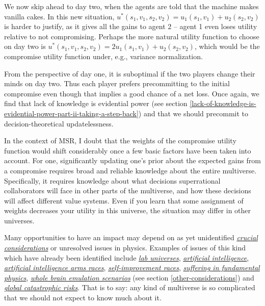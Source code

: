 We now skip ahead to day two, when the agents are told that the machine
makes vanilla cakes. In this new situation,
\(u^{*}(s_{1},v_{1},s_{2},v_{2}) = u_{1}(s_{1},v_{1}) + u_{2}(s_{2},v_{2})\)
is harder to justify, as it gives all the gains to agent 2 -- agent 1
even loses utility relative to not compromising. Perhaps the more
natural utility function to choose on day two is
\(u^{*}(s_{1},v_{1},s_{2},v_{2}) = {2u}_{1}(s_{1},v_{1}) + u_{2}(s_{2},v_{2})\),
which would be the compromise utility function under, e.g., variance
normalization.

From the perspective of day one, it is suboptimal if the two players
change their minds on day two. Thus each player prefers precommitting to
the initial compromise even though that implies a good chance of a net
loss. Once again, we find that lack of knowledge is evidential power
(see section
\ref{lack-of-knowledge-is-evidential-power-part-ii-taking-a-step-back}) and
that we should precommit to decision-theoretical updatelessness.

In the context of MSR, I doubt that the weights of the compromise
utility function would shift considerably once a few basic factors have
been taken into account. For one, significantly updating one's prior
about the expected gains from a compromise requires broad and reliable
knowledge about the entire multiverse. Specifically, it requires
knowledge about what decisions superrational collaborators will face in
other parts of the multiverse, and how these decisions will affect
different value systems. Even if you learn that some assignment of
weights decreases your utility in this universe, the situation may
differ in other universes.

Many opportunities to have an impact may depend on as yet unidentified
\href{https://casparoesterheld.files.wordpress.com/2016/11/crucialconsiderations1.pdf}{\emph{crucial
considerations}} or unresolved issues in physics. Examples of issues of
this kind which have already been identified include
\href{http://reducing-suffering.org/lab-universes-creating-infinite-suffering/}{\emph{lab
universes}},
\href{https://foundational-research.org/why-altruists-should-focus-on-artificial-intelligence/}{\emph{artificial
intelligence}},
\href{https://wiki.lesswrong.com/wiki/AI_arms_race}{\emph{artificial
intelligence arms races}},
\href{https://casparoesterheld.com/2016/07/04/self-improvement-races/}{\emph{self-improvement
races}},
\href{http://reducing-suffering.org/is-there-suffering-in-fundamental-physics/}{\emph{suffering
in fundamental physics}}, \protect\hyperlink{_v01fa6ipo6d7}{\emph{whole
brain emulation scenarios}} (see section
\ref{other-considerations}) and
\href{https://en.wikipedia.org/wiki/Global_catastrophic_risk}{\emph{global
catastrophic risks}}. That is to say: any kind of multiverse is so
complicated that we should not expect to know much about it.

